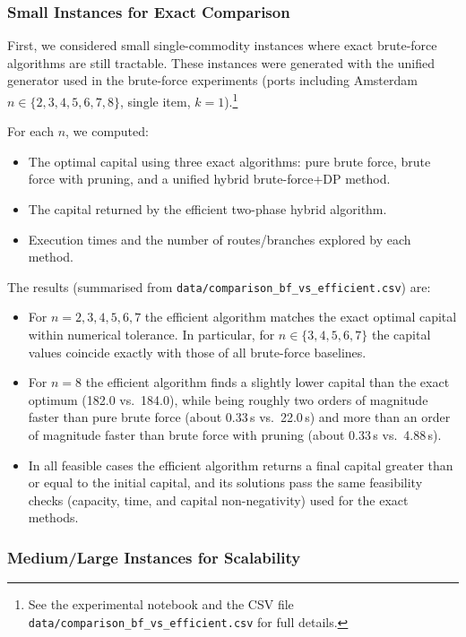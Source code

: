 \documentclass[12pt]{article}
\begin{document}
\subsubsection{Small Instances for Exact Comparison}

First, we considered small single-commodity instances where exact brute-force algorithms are still tractable. These instances were generated with the unified generator used in the brute-force experiments (ports including Amsterdam $n \in \{2,3,4,5,6,7,8\}$, single item, $k=1$).\footnote{See the experimental notebook and the CSV file \texttt{data/comparison\_bf\_vs\_efficient.csv} for full details.}

For each $n$, we computed:
\begin{itemize}
    \item The optimal capital using three exact algorithms: pure brute force, brute force with pruning, and a unified hybrid brute-force+DP method.
    \item The capital returned by the efficient two-phase hybrid algorithm.
    \item Execution times and the number of routes/branches explored by each method.
\end{itemize}

The results (summarised from \texttt{data/comparison\_bf\_vs\_efficient.csv}) are:
\begin{itemize}
    \item For $n = 2,3,4,5,6,7$ the efficient algorithm matches the exact optimal capital within numerical tolerance. In particular, for $n \in \{3,4,5,6,7\}$ the capital values coincide exactly with those of all brute-force baselines.
    \item For $n = 8$ the efficient algorithm finds a slightly lower capital than the exact optimum (182.0 vs.\ 184.0), while being roughly two orders of magnitude faster than pure brute force (about 0.33\,s vs.\ 22.0\,s) and more than an order of magnitude faster than brute force with pruning (about 0.33\,s vs.\ 4.88\,s).
    \item In all feasible cases the efficient algorithm returns a final capital greater than or equal to the initial capital, and its solutions pass the same feasibility checks (capacity, time, and capital non-negativity) used for the exact methods.
\end{itemize}

\subsubsection{Medium/Large Instances for Scalability}
\end{document}
